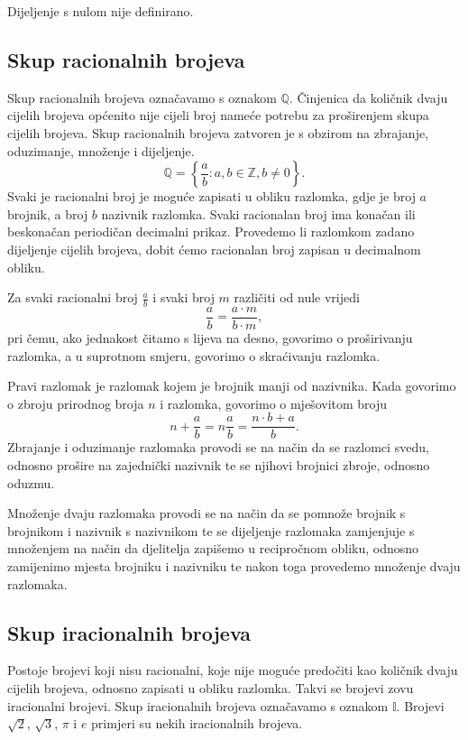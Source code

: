 Dijeljenje s nulom nije definirano.

\subsection{Skup racionalnih brojeva}\label{subsec:skup-racionalnih-brojeva}
Skup racionalnih brojeva označavamo s oznakom $\mathbb{Q}$.
Činjenica da količnik dvaju cijelih brojeva općenito nije cijeli broj nameće potrebu za proširenjem skupa cijelih brojeva.
Skup racionalnih brojeva zatvoren je s obzirom na zbrajanje, oduzimanje, množenje i dijeljenje.
\[ \mathbb{Q}=\left\{\frac{a}{b} : a,b \in \mathbb{Z}, b \neq 0 \right\}. \]
Svaki je racionalni broj je moguće zapisati u obliku razlomka, gdje je broj $a$ brojnik, a broj $b$ nazivnik razlomka.
Svaki racionalan broj ima konačan ili beskonačan periodičan decimalni prikaz.
Provedemo li razlomkom zadano dijeljenje cijelih brojeva, dobit ćemo racionalan broj zapisan u decimalnom obliku.

Za svaki racionalni broj $\displaystyle \frac{a}{b}$ i svaki broj $m$ različiti od nule vrijedi
\[ \frac{a}{b} = \frac{a \cdot m}{b \cdot m}, \]
pri čemu, ako jednakost čitamo s lijeva na desno, govorimo o proširivanju razlomka, a u suprotnom smjeru, govorimo o skraćivanju razlomka.

Pravi razlomak je razlomak kojem je brojnik manji od nazivnika.
Kada govorimo o zbroju prirodnog broja $n$ i razlomka, govorimo o mješovitom broju
\[ n + \frac{a}{b} = n\frac{a}{b} = \frac{n \cdot b + a}{b}. \]
Zbrajanje i oduzimanje razlomaka provodi se na način da se razlomci svedu, odnosno prošire na zajednički nazivnik te se njihovi brojnici zbroje, odnosno oduzmu.

Množenje dvaju razlomaka provodi se na način da se pomnože brojnik s brojnikom i nazivnik s nazivnikom te se dijeljenje razlomaka zamjenjuje s množenjem na način da djelitelja zapišemo u recipročnom obliku, odnosno zamijenimo mjesta brojniku i nazivniku te nakon toga provedemo množenje dvaju razlomaka.

\subsection{Skup iracionalnih brojeva}\label{subsec:skup-iracionalnih-brojeva}
Postoje brojevi koji nisu racionalni, koje nije moguće predočiti kao količnik dvaju cijelih brojeva, odnosno zapisati u obliku razlomka.
Takvi se brojevi zovu iracionalni brojevi.
Skup iracionalnih brojeva označavamo s oznakom $\mathbb{I}$.
Brojevi $\sqrt{2}$, $\sqrt{3}$, $\pi$ i $e$  primjeri su nekih iracionalnih brojeva.

